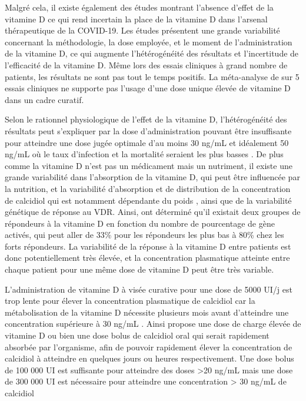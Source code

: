 \documentclass[
  a4paper,
  DIV=11,
  numbers=noendperiod,
  listof=totoc]{scrreprt}
\begin{document}
Malgré cela, il existe également des études montrant l'absence d'effet
de la vitamine D ce qui rend incertain la place de la vitamine D dans
l'arsenal thérapeutique de la COVID-19. Les études présentent une grande
variabilité concernant la méthodologie, la dose employée, et le moment
de l'administration de la vitamine D, ce qui augmente l'hétérogénéité
des résultats et l'incertitude de l'efficacité de la vitamine D. Même
lors des essais cliniques à grand nombre de patients, les résultats ne
sont pas tout le temps positifs. La méta-analyse de
\textcite{Zhong.2024} sur 5 essais cliniques ne supporte pas l'usage
d'une dose unique élevée de vitamine D dans un cadre curatif.

Selon le rationnel physiologique de l'effet de la vitamine D,
l'hétérogénéité des résultats peut s'expliquer par la dose
d'administration pouvant être insuffisante pour atteindre une dose jugée
optimale d'au moins 30 ng/mL et idéalement 50 ng/mL où le taux
d'infection et la mortalité seraient les plus basses
\autocite{Wimalawansa.2022,Kaufman.2020,Borsche.2021}. De plus comme la
vitamine D n'est pas un médicament mais un nutriment, il existe une
grande variabilité dans l'absorption de la vitamine D, qui peut être
influencée par la nutrition, et la variabilité d'absorption et de
distribution de la concentration de calcidiol qui est notamment
dépendante du poids \autocite{Ekwaru.2014}, ainsi que de la variabilité
génétique de réponse au VDR. Ainsi, \textcite{Vukić.2015} ont déterminé
qu'il existait deux groupes de répondeurs à la vitamine D en fonction du
nombre de pourcentage de gène activés, qui peut aller de 33\% pour les
répondeurs les plus bas à 80\% chez les forts répondeurs. La variabilité
de la réponse à la vitamine D entre patients est donc potentiellement
très élevée, et la concentration plasmatique atteinte entre chaque
patient pour une même dose de vitamine D peut être très variable.

L'administration de vitamine D à visée curative pour une dose de 5000
UI/j est trop lente pour élever la concentration plasmatique de
calcidiol car la métabolisation de la vitamine D nécessite plusieurs
mois avant d'atteindre une concentration supérieure à 30 ng/mL
\autocite{Mocanu.2009}. Ainsi \textcite{Wimalawansa.2022} propose une
dose de charge élevée de vitamine D ou bien une dose bolus de calcidiol
oral qui serait rapidement absorbée par l'organisme, afin de pouvoir
rapidement élever la concentration de calcidiol à atteindre en quelques
jours ou heures respectivement. Une dose bolus de 100 000 UI est
suffisante pour atteindre des doses \textgreater20 ng/mL mais une dose
de 300 000 UI est nécessaire pour atteindre une concentration
\textgreater{} 30 ng/mL de calcidiol \autocite{Kearns.2014}
\end{document}
